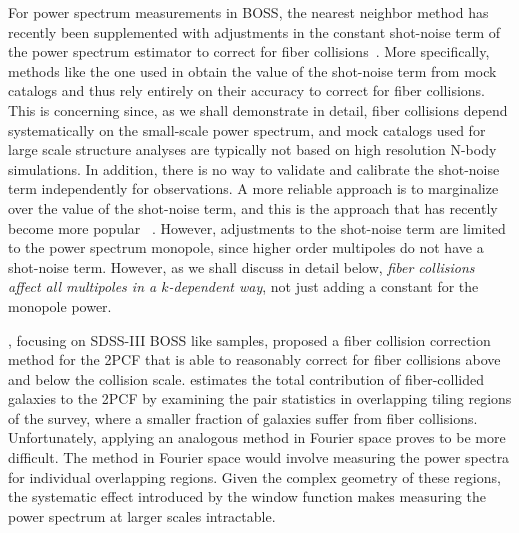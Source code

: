 For power spectrum measurements in BOSS, 
the nearest neighbor method has recently been supplemented with adjustments 
in the constant shot-noise term of the power spectrum estimator to correct 
for fiber collisions~\citep{Beutler:2014aa, Gil-Marin:2014aa, 
Gil-Marin:2016ab, Gil-Marin:2016aa, Beutler:2016aa, Grieb:2016aa}. More specifically, 
methods like the one used in 
\cite{Gil-Marin:2014aa} obtain the value of the shot-noise term from mock catalogs and thus rely entirely on their accuracy to correct for fiber collisions. 
This is concerning since, as we shall demonstrate in detail, fiber 
collisions depend systematically on the small-scale power spectrum, and mock catalogs used for large scale structure analyses are typically 
not based on high resolution N-body simulations. In addition, there is no way to validate and 
calibrate the shot-noise term independently for observations. A more 
reliable approach is to marginalize over the value of the shot-noise 
term, and this is the approach that has recently become more popular
~\citep{Gil-Marin:2016ab, Beutler:2016aa, Grieb:2016aa, Gil-Marin:2016aa}. 
However, adjustments to the shot-noise term are limited to the power spectrum monopole, since higher order multipoles do not have a shot-noise term. However, as we shall discuss in detail below, {\em fiber collisions affect all multipoles in a $k$-dependent way}, not just adding a constant for the monopole power.

\cite{Guo:2012aa}, focusing on SDSS-III BOSS like samples, proposed 
a fiber collision correction method for the 2PCF that is able to reasonably 
correct for fiber collisions above and below the collision scale. 
\cite{Guo:2012aa} estimates the total contribution of fiber-collided galaxies 
to the 2PCF by examining the pair statistics in overlapping tiling regions of 
the survey, where a smaller fraction of galaxies suffer from fiber collisions.
Unfortunately, applying an analogous method in Fourier space proves to be more difficult. 
The \cite{Guo:2012aa} method in Fourier space would involve measuring the power spectra 
for individual overlapping regions. Given the complex geometry of these 
regions, the systematic effect introduced by the window function makes 
measuring the power spectrum at larger scales intractable. 


